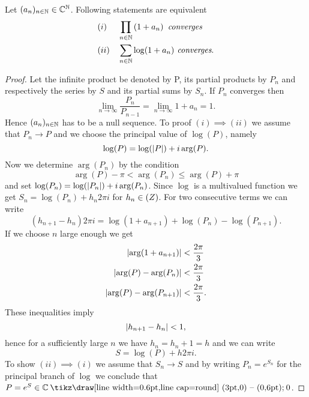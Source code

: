\begin{lemma}
	Let $(a_n)_{n \in \mathbb{N}} \in \mathbb{C}^{\mathbb{N}}$. Following statements are equivalent
\begin{equation*}
\begin{aligned}
	&(i) &&\prod_{n \in \mathbb{N}} \left(1 + a_n\right) \textit{ converges} \\
	&(ii) &&\sum_{n \in \mathbb{N}} \log(1 + a_n) \textit{ converges}.
\end{aligned}
\end{equation*}
\end{lemma}
\begin{proof} Let the infinite product be denoted by P, its partial products by $P_n$ and respectively the series by $S$ and its partial sums by $S_n$. If $P_n$ converges then
\begin{equation*}
	\lim\limits_{n \to \infty} \frac{P_n}{P_{n - 1}} = \lim\limits_{n \to \infty} 1 + a_n = 1.
\end{equation*}
	Hence $(a_n)_{n \in \mathbb{N}}$ has to be a null sequence. To proof $(i) \implies (ii)$ we assume that $P_n \to P$ and we choose the principal value of $\log(P)$, namely
\begin{equation*}
	\log(P) = \log(\left|P\right|) + i \arg(P).
\end{equation*}
	Now we determine $\arg(P_n)$ by the condition
\begin{equation*}	
	\arg(P) - \pi < \arg(P_n) \leq \arg(P) + \pi
\end{equation*}
	and set $\log(P_n) = \log(\left|P_n\right|) + i \arg(P_n)$. Since $\log$ is a multivalued function we get $S_n = \log(P_n) + h_n 2 \pi i$ for $h_n \in \mathbb{(}Z)$. For two consecutive terms we can write
\begin{equation*}
	(h_{n + 1} - h_n) 2 \pi i = \log(1 + a_{n + 1}) + \log(P_n) - \log(P_{n + 1}).
\end{equation*}
	If we choose $n$ large enough we get
\begin{equation*}
\begin{aligned}
	\left|\arg(1 + a_{n + 1})\right| &< \frac{2 \pi}{3} \\
	\left|\arg(P) - \arg(P_n)\right| &< \frac{2 \pi}{3} \\
	\left|\arg(P) - \arg(P_{n + 1})\right| &< \frac{2 \pi}{3}.
\end{aligned}
\end{equation*}
	These inequalities imply
\begin{equation*}
	\left|h_{n + 1} - h_n\right| < 1,
\end{equation*}
	hence for a sufficiently large $n$ we have $h_n = h_n + 1 = h$ and we can write
\begin{equation*}
	S = \log(P) + h 2 \pi i.
\end{equation*}
	To show $(ii) \implies (i)$ we assume that $S_n \to S$ and by writing $P_n = e^{S_n}$ for the principal branch of $\log$ we conclude that $P = e^{S} \in \field{C} \mysetminus {0}$.
\end{proof}


